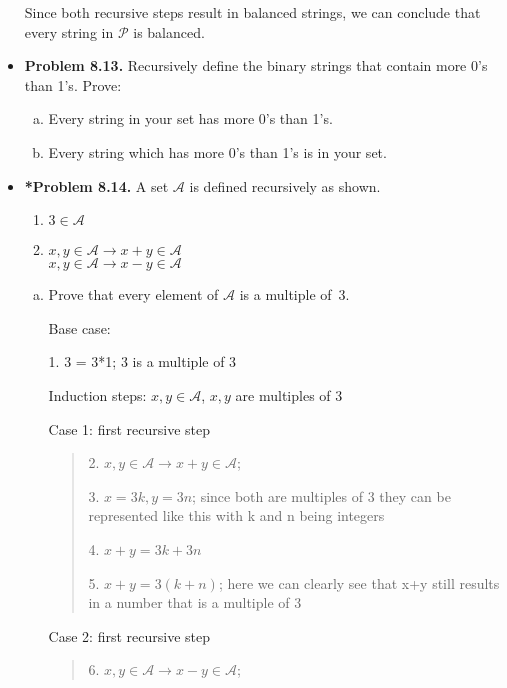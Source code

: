 \documentclass[11pt]{article}
\def\imp{\rightarrow}
\begin{document}
\begin{itemize}
Since both recursive steps result in balanced strings, we can conclude that every string in $\mathcal{P}$ is balanced.

\vspace{0.1in}

\item \textbf{Problem 8.13.}
Recursively define the binary strings that contain more 0's than 1's.
Prove:
\begin{enumerate}[(a)]
\item Every string in your set has more 0's than 1's.
\item Every string which has more 0's than 1's is in your set.
\end{enumerate}

\vspace{0.1in}

\item \textbf{*Problem 8.14.}
A set $\mathcal{A}$ is defined recursively as shown.
\begin{enumerate}[(1)]
\item $3\in\mathcal{A}$
\item $x,y\in\mathcal{A}\imp x+y\in\mathcal{A}$ \\
  $x,y\in\mathcal{A}\imp x-y\in\mathcal{A}$
\end{enumerate}
\begin{enumerate}[(a)]
\item Prove that every element of $\mathcal{A}$ is a multiple of~3.

Base case:

1. 3 = 3*1; 3 is a multiple of 3

Induction steps: $x, y \in \mathcal{A}$, $x, y$ are multiples of 3

Case 1: first recursive step
\begin{quote}
2. $x,y \in \mathcal{A} \xrightarrow{} x+y \in \mathcal{A}$;

3. $x = 3k, y = 3n$; since both are multiples of 3 they can be represented like this with k and n being integers

4. $x+y = 3k + 3n$

5. $x+y = 3(k+n)$; here we can clearly see that x+y still results in a number that is a multiple of 3 

\end{quote}

Case 2: first recursive step
\begin{quote}
6. $x,y \in \mathcal{A} \xrightarrow{} x-y \in \mathcal{A}$;


\end{quote}
\end{enumerate}
\end{itemize}
\end{document}
